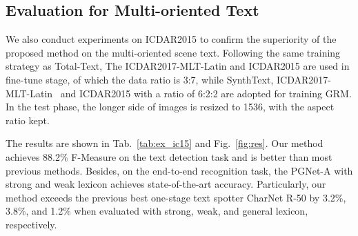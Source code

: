\documentclass[letterpaper]{article} \usepackage{aaai21}  \usepackage{times}  \usepackage{helvet} \usepackage{courier}  \usepackage[hyphens]{url}  \usepackage{graphicx} \urlstyle{rm} \def\UrlFont{\rm}  \usepackage{natbib}  \usepackage{caption} \usepackage{bm}
\begin{document}
\subsection{Evaluation for Multi-oriented Text} We also conduct experiments on ICDAR2015 to confirm the superiority of the proposed method on the multi-oriented scene text. Following the same training strategy as Total-Text, The ICDAR2017-MLT-Latin and ICDAR2015 are used in fine-tune stage, of which the data ratio is 3:7, while SynthText, ICDAR2017-MLT-Latin~\cite{nayef2017icdar2017} and ICDAR2015 with a ratio of 6:2:2 are adopted for training GRM. In the test phase, the longer side of images is resized to 1536, with the aspect ratio kept.

The results are shown in Tab.~\ref{tab:ex_ic15} and Fig.~\ref{fig:res}. Our method achieves 88.2\% F-Measure on the text detection task and is better than most previous methods. Besides, on the end-to-end recognition task, the PGNet-A with strong and weak lexicon achieves state-of-the-art accuracy. Particularly, our method exceeds the previous best one-stage text spotter CharNet R-50 by 3.2\%, 3.8\%, and 1.2\%  when evaluated with strong, weak, and general lexicon, respectively.
\end{document}
